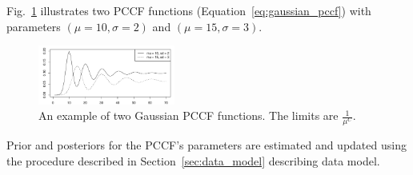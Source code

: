 Fig.~\ref{fig:pccf_example} illustrates two PCCF
functions (Equation~\ref{eq:gaussian_pccf}) with parameters $(\mu=10, \sigma=2)$ and $(\mu=15, \sigma=3)$.
\begin{figure}[htb!]
    \centering
    \includegraphics[width=0.40\textwidth]{images/blpa_article/pccfExamples.pdf}
    \caption{
        An example of two Gaussian PCCF functions.
        The limits are $\frac{1}{\mu^C}.$
    }
    \label{fig:pccf_example}
\end{figure}
Prior and posteriors for the PCCF's parameters are estimated and updated using the procedure described in Section~\ref{sec:data_model} describing data model.

